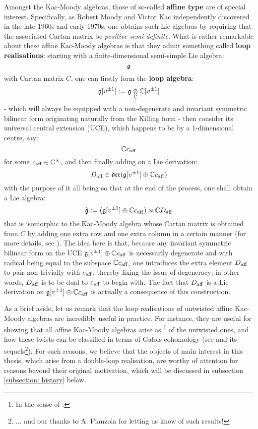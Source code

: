         Amongst the Kac-Moody algebras, those of so-called \textbf{affine type} are of special interest. Specifically, as Robert Moody and Victor Kac independently discovered in the late 1960s and early 1970s, one obtains such Lie algebras by requiring that the associated Cartan matrix be \textit{positive-semi-definite}. What is rather remarkable about these affine Kac-Moody algebras is that they admit something called \textbf{loop realisations}: starting with a finite-dimensional semi-simple Lie algebra:
            $$\mathfrak{g}$$
        with Cartan matrix $C$, one can firstly form the \textbf{loop algebra}:
            $$\g[v^{\pm 1}] := \g \tensor_{\bbC} \bbC[v^{\pm 1}]$$
        - which will always be equipped with a non-degenerate and invariant symmetric bilinear form originating naturally from the Killing form - then consider its universal central extension (UCE), which happens to be by a $1$-dimensional centre, say:
            $$\mathbb{C} c_{\mathrm{aff}}$$
        for some $c_{\aff} \in \bbC^{\x}$, and then finally adding on a Lie derivation:
            $$D_{\mathrm{aff}} \in \mathfrak{der}(\mathfrak{g}[v^{\pm 1}] \oplus \mathbb{C} c_{\mathrm{aff}})$$
        with the purpose of it all being so that at the end of the process, one shall obtain a Lie algebra:
            $$\hat{\mathfrak{g}} := (\mathfrak{g}[v^{\pm 1}] \oplus \mathbb{C} c_{\mathrm{aff}}) \rtimes \mathbb{C} D_{\mathrm{aff}}$$
        that is isomorphic to the Kac-Moody algebra whose Cartan matrix is obtained from $C$ by adding one extra row and one extra column in a certain manner (for more details, see \cite[Chapter 7]{kac_infinite_dimensional_lie_algebras}). The idea here is that, because any invariant symmetric bilinear form on the UCE $\mathfrak{g}[v^{\pm 1}] \oplus \mathbb{C} c_{\mathrm{aff}}$ is necessarily degenerate and with radical being equal to the subspace $\mathbb{C} c_{\mathrm{aff}}$, one introduces the extra element $D_{\mathrm{aff}}$ to pair non-trivially with $c_{\mathrm{aff}}$, thereby fixing the issue of degeneracy; in other words, $D_{\mathrm{aff}}$ is to be dual to $c_{\mathrm{aff}}$ to begin with. The fact that $D_{\mathrm{aff}}$ is a Lie derivation on $\mathfrak{g}[v^{\pm 1}] \oplus \mathbb{C} c_{\mathrm{aff}}$ is actually a consequence of this construction.
        
        As a brief aside, let us remark that the loop realisations of untwisted affine Kac-Moody algebras are incredibly useful in practice. For instance, they are useful for showing that all affine Kac-Moody algebras arise as \footnote{In the sense of \cite[Chapter 8]{kac_infinite_dimensional_lie_algebras}.} of the untwisted ones, and how these twists can be classified in terms of Galois cohomology (see \cite{pianzola_vanishing_of_H1_of_dedekind_rings} and its sequels\footnote{... and our thanks to A. Pianzola for letting us know of such results!}). For such reasons, we believe that the objects of main interest in this thesis, which arise from a double-loop realisation, are worthy of attention for reasons beyond their original motivation, which will be discussed in subsection \ref{subsection: history} below.

